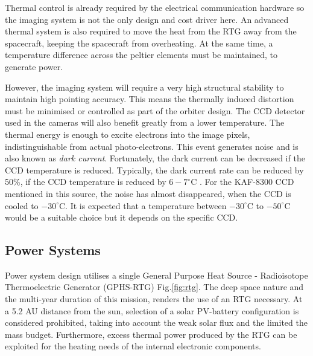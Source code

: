 Thermal control is already required by the electrical communication hardware so the imaging system is not the only design and cost driver here. An advanced thermal system is also required to move the heat from the RTG away from the spacecraft, keeping the spacecraft from overheating. At the same time, a temperature difference across the peltier elements must be maintained, to generate power. 

However, the imaging system will require a very high structural stability to maintain high pointing accuracy. This means the thermally induced distortion must be minimised or controlled as part of the orbiter design. The CCD detector used in the cameras will also benefit greatly from a lower temperature. The thermal energy is enough to excite electrons into the image pixels, indistinguishable from actual photo-electrons. This event generates noise and is also known as \textit{dark current}. Fortunately, the dark current can be decreased if the CCD temperature is reduced. Typically, the dark current rate can be reduced by 50\%, if the CCD temperature is reduced by $6-7^\circ$C \cite{sbig2014}. For the KAF-8300 CCD mentioned in this source, the noise has almost disappeared, when the CCD is cooled to $-30^\circ$C. It is expected that a temperature between $-30^\circ$C to $-50^\circ$C would be a suitable choice but it depends on the specific CCD.
\subsection{Power Systems}
Power system design utilises a single General Purpose Heat Source - Radioisotope Thermoelectric Generator (GPHS-RTG) Fig.\ref{fig:rtg}. The deep space nature and the multi-year duration of this mission, renders the use of an RTG necessary. At a 5.2 AU distance from the sun, selection of a solar PV-battery configuration is considered prohibited, taking into account the weak solar flux and the limited the mass budget. Furthermore, excess thermal power produced by the RTG can be exploited for the heating needs of the internal electronic components.

